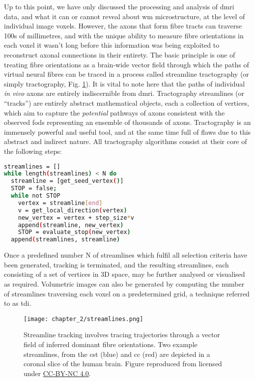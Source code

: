 Up to this point, we have only discussed the processing and analysis of \gls{dmri} data, and what it can or cannot reveal about \gls{wm} microstructure, at the level of individual image \glspl{voxel}.
However, the axons that form fibre tracts can traverse 100s of millimetres, and with the unique ability to measure fibre orientations in each voxel it wasn't long before this information was being exploited to reconstruct axonal connections in their entirety.
The basic principle is one of treating fibre orientations as a brain-wide vector field through which the paths of virtual neural fibres can be traced in a process called streamline tractography (or simply tractography, Fig. \ref{fig:tracking}).
It is vital to note here that the paths of individual \textit{in vivo} axons are entirely indiscernible from \gls{dmri}.
Tractography streamlines (or ``tracks'') are entirely abstract mathematical objects, each a collection of vertices, which aim to capture the \textit{potential} pathways of axons consistent with the observed \glspl{fod} representing an ensemble of thousands of axons.
Tractography is an immensely powerful and useful tool, and at the same time full of flaws due to this abstract and indirect nature.
All tractography algorithms consist at their core of the following steps:

\begin{lstlisting}[language=bash,label={lst:track},frame=single]
streamlines = []
while length(streamlines) < N do
  streamline = [get_seed_vertex()]
  STOP = false;
  while not STOP
    vertex = streamline[end]
    v = get_local_direction(vertex)
    new_vertex = vertex + step_size*v
    append(streamline, new_vertex)
    STOP = evaluate_stop(new_vertex)
  append(streamlines, streamline)
\end{lstlisting}

Once a predefined number N of streamlines which fulfil all selection criteria have been generated, tracking is terminated, and the resulting streamlines, each consisting of a set of vertices in 3D space, may be further analysed or visualised as required.
Volumetric images can also be generated by computing the number of streamlines traversing each voxel on a predetermined grid, a technique referred to as \gls{tdi}\autocite{Calamante2010}.

\begin{figure}
  \texttt{[image: chapter\_2/streamlines.png]}
  \caption[Streamline tractography]{Streamline tracking involves tracing trajectories through a vector field of inferred dominant fibre orientations. Two example streamlines, from the \gls{cst} (blue) and \gls{cc} (red) are depicted in a coronal slice of the human brain. Figure reproduced from \textcite{Jeurissen2019} licensed under \href{https://creativecommons.org/licenses/by-nc/4.0/}{CC-BY-NC 4.0}.}
  \label{fig:tracking}
\end{figure}

